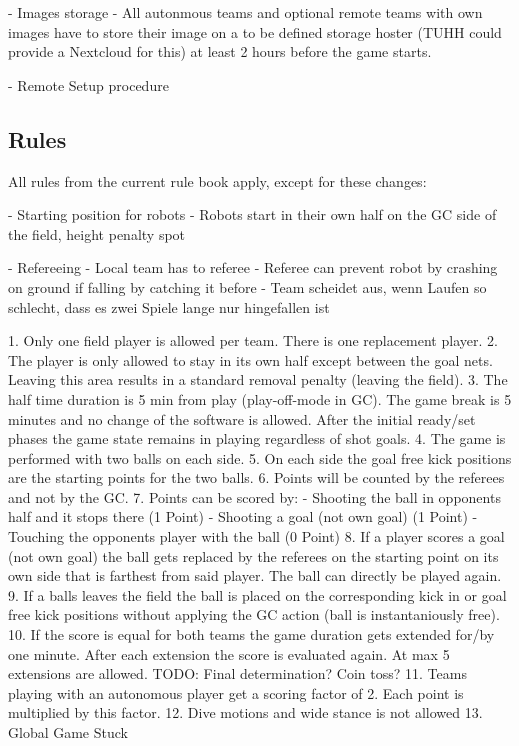 - Images storage
    - All autonmous teams and optional remote teams with own images have to store their image on a to be defined storage hoster (TUHH could provide a Nextcloud for this) at least 2 hours before the game starts.

- Remote Setup procedure

\subsection{Rules}
All rules from the current rule book apply, except for these changes:

- Starting position for robots
    - Robots start in their own half on the GC side of the field, height penalty spot

- Refereeing
    - Local team has to referee
    - Referee can prevent robot by crashing on ground if falling by catching it before
    - Team scheidet aus, wenn Laufen so schlecht, dass es zwei Spiele lange nur hingefallen ist

1. Only one field player is allowed per team. There is one replacement player.
2. The player is only allowed to stay in its own half except between the goal nets. Leaving this area results in a standard removal penalty (leaving the field).
3. The half time duration is 5 min from play (play-off-mode in GC). The game break is 5 minutes and no change of  the software is allowed. After the initial ready/set phases the game state remains in playing regardless of shot goals.
4. The game is performed with two balls on each side.
5. On each side the goal free kick positions are the starting points for the two balls.
6. Points will be counted by the referees and not by the GC.
7. Points can be scored by:
    - Shooting the ball in opponents half and it stops there (1 Point)
    - Shooting a goal (not own goal) (1 Point)
    - Touching the opponents player with the ball (0 Point)
8. If a player scores a goal (not own goal) the ball gets replaced by the referees on the starting point on its own side that is farthest from said player. The ball can directly be played again.
9. If a balls leaves the field the ball is placed on the corresponding kick in or goal free kick positions without applying the GC action (ball is instantaniously free).
10. If the score is equal for both teams the game duration gets extended for/by one minute. After each extension the score is evaluated again. At max 5 extensions are allowed. TODO: Final determination? Coin toss?
11. Teams playing with an autonomous player get a scoring factor of 2. Each point is multiplied by this factor.
12. Dive motions and wide stance is not allowed
13. Global Game Stuck

